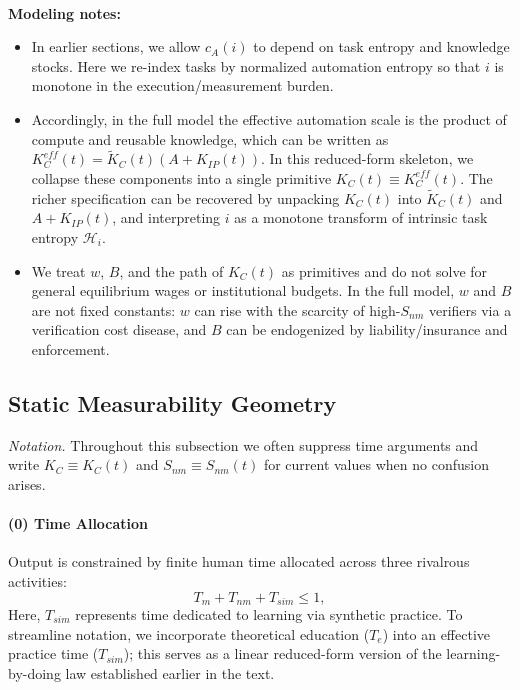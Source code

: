 \documentclass[12pt, letter]{article}
\begin{document}
\noindent\textbf{\\ Modeling notes:} 
\begin{itemize}
    \item In earlier sections, we allow $c_A(i)$ to depend on task entropy and knowledge stocks. Here we re-index tasks by normalized automation entropy so that $i$ is monotone in the execution/measurement burden. 
    \item Accordingly, in the full model the effective automation scale is the product of compute and reusable knowledge, which can be written as $K_C^{eff}(t)=\tilde{K}_C(t)(A+K_{IP}(t))$. In this reduced-form skeleton, we collapse these components into a single primitive $K_C(t) \equiv K_C^{eff}(t)$. The richer specification can be recovered by unpacking $K_C(t)$ into $\tilde{K}_C(t)$ and $A+K_{IP}(t)$, and interpreting $i$ as a monotone transform of intrinsic task entropy $\mathcal{H}_i$.
    
    \item We treat $w$, $B$, and the path of $K_C(t)$ as primitives and do not solve for general equilibrium wages or institutional budgets. In the full model, $w$ and $B$ are not fixed constants: $w$ can rise with the scarcity of high-$S_{nm}$ verifiers via a verification cost disease, and $B$ can be endogenized by liability/insurance and enforcement.
\end{itemize}
\vspace{1em}


\subsection{Static Measurability Geometry}\label{subsec:core-static}

\noindent\emph{Notation.} Throughout this subsection we often suppress time arguments and write $K_C \equiv K_C(t)$ and $S_{nm}\equiv S_{nm}(t)$ for current values when no confusion arises.

\paragraph{(0) Time Allocation}
Output is constrained by finite human time allocated across three rivalrous activities:
\begin{equation}
T_m + T_{nm} + T_{sim} \le 1,
 \label{eq:time-scarcity-core}
\end{equation}
Here, $T_{sim}$ represents time dedicated to learning via synthetic practice. To streamline notation, we incorporate theoretical education ($T_e$) into an effective practice time ($T_{sim}$); this serves as a linear reduced-form version of the learning-by-doing law established earlier in the text.
\end{document}
